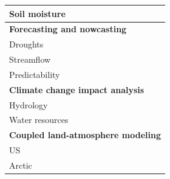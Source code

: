 \documentclass[gmd, manuscript]{copernicus}
\begin{document}
\begin{table}[]
{\begin{tabular}{ll}
    \multicolumn{1}{l|}{Soil moisture}           & \citet{Pan_2006}  \\ \hline
    \multicolumn{2}{l}{\textbf{Forecasting and nowcasting}}                                                                                                         \\ \hline
    \multicolumn{1}{l|}{Droughts}                & \citet{Shukla_2011}  \\ \hline
    \multicolumn{1}{l|}{Streamflow}              & \citet{Hamlet_1999,Li_2009,Wood_2002}  \\ \hline
    \multicolumn{1}{l|}{Predictability}          & \citet{Gebregiorgis_2011,Maurer_2003}  \\ \hline
    \multicolumn{2}{l}{\textbf{Climate change impact analysis}}                                                                                                     \\ \hline
    \multicolumn{1}{l|}{Hydrology}               & \citet{Barnett_2005,Beyene_2010,Nijssen_2001b}  \\ \hline
    \multicolumn{1}{l|}{Water resources}         & \citet{Christensen_2007,Christensen_2004,Das_2011,Hamlet_1999}  \\ \hline
    \multicolumn{2}{l}{\textbf{Coupled land-atmosphere modeling}}                                                                                                     \\ \hline
    \multicolumn{1}{l|}{US}                      & \citet{Zhu_2009}                                           \\ \hline
    \multicolumn{1}{l|}{Arctic}                  & \citet{Hamman_2016a} \\ \hline
  \end{tabular}
  }
\end{table}
\end{document}

